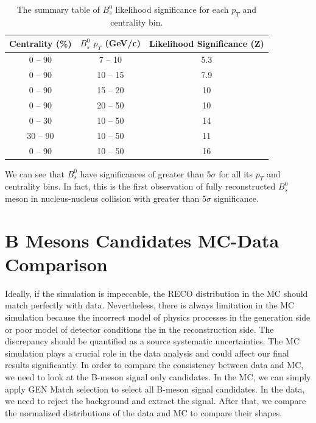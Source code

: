 \begin{table}[h]
\begin{center}
\caption{The summary table of $B^0_s$ likelihood significance for each $p_T$ and centrality bin.}
\vspace{1em}
\label{BsSig}
  \begin{tabular}{ |c|c|c|}
    \hline 
Centrality (\%) & $B^0_s$ $p_T$ (GeV/c) & Likelihood Significance (Z)  \\
     \hline
0 -- 90 & 7 -- 10 & 5.3 \\
0 -- 90 & 10 -- 15 & 7.9 \\
0 -- 90 & 15 -- 20 & 10 \\
0 -- 90 & 20 -- 50 & 10 \\
0 -- 30 & 10 -- 50 &  14 \\
30 -- 90 & 10 -- 50 &  11\\
0 -- 90 & 10 -- 50 & 16 \\
     \hline
    \hline
\end{tabular}
\end{center}
\end{table}



We can see that $B^0_s$ have significances of greater than 5$\sigma$ for all its $p_T$ and centrality bins. In fact, this is the first observation of fully reconstructed $B^0_s$ meson in nucleus-nucleus collision with greater than 5$\sigma$ significance. 

\section{B Mesons Candidates MC-Data Comparison}

Ideally, if the simulation is impeccable, the RECO distribution in the MC should match perfectly with data. Nevertheless, there is always limitation in the MC simulation because the incorrect model of physics processes in the generation side or poor model of detector conditions the in the reconstruction side. The discrepancy should be quantified as a source systematic uncertainties. The MC simulation plays a crucial role in the data analysis and could affect our final results significantly. In order to compare the consistency between data and MC, we need to look at the B-meson signal only candidates. In the MC, we can simply apply GEN Match selection to select all B-meson signal candidates. In the data, we need to reject the background and extract the signal. After that, we compare the normalized distributions of the data and MC to compare their shapes. 


